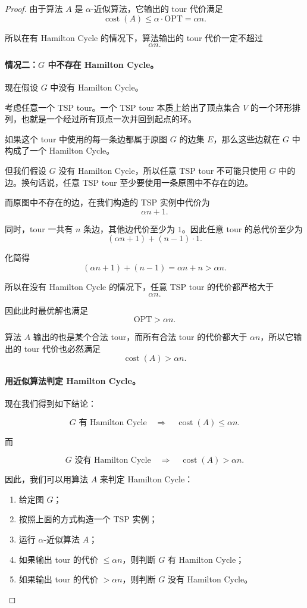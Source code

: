 \documentclass[UTF8,openany,12pt]{ctexbook}
\theoremstyle{remark}
\newcommand{\OPT}{\mathrm{OPT}}
\begin{document}
\begin{proof}
由于算法 $A$ 是 $\alpha$-近似算法，它输出的 tour 代价满足
\[
\operatorname{cost}(A) \le \alpha \cdot \OPT = \alpha n.
\]

所以在有 Hamilton Cycle 的情况下，算法输出的 tour 代价一定不超过
\[
\alpha n.
\]

\paragraph{情况二：$G$ 中不存在 Hamilton Cycle。}

现在假设 $G$ 中没有 Hamilton Cycle。

考虑任意一个 TSP tour。一个 TSP tour 本质上给出了顶点集合 $V$ 的一个环形排列，也就是一个经过所有顶点一次并回到起点的环。

如果这个 tour 中使用的每一条边都属于原图 $G$ 的边集 $E$，那么这些边就在 $G$ 中构成了一个 Hamilton Cycle。

但我们假设 $G$ 没有 Hamilton Cycle，所以任意 TSP tour 不可能只使用 $G$ 中的边。换句话说，任意 TSP tour 至少要使用一条原图中不存在的边。

而原图中不存在的边，在我们构造的 TSP 实例中代价为
\[
\alpha n + 1.
\]

同时，tour 一共有 $n$ 条边，其他边代价至少为 $1$。因此任意 tour 的总代价至少为
\[
(\alpha n + 1) + (n-1)\cdot 1.
\]

化简得
\[
(\alpha n + 1) + (n-1)
= \alpha n + n
> \alpha n.
\]

所以在没有 Hamilton Cycle 的情况下，任意 TSP tour 的代价都严格大于
\[
\alpha n.
\]

因此此时最优解也满足
\[
\OPT > \alpha n.
\]

算法 $A$ 输出的也是某个合法 tour，而所有合法 tour 的代价都大于 $\alpha n$，所以它输出的 tour 代价也必然满足
\[
\operatorname{cost}(A) > \alpha n.
\]

\paragraph{用近似算法判定 Hamilton Cycle。}

现在我们得到如下结论：

\[
G \text{ 有 Hamilton Cycle}
\quad \Longrightarrow \quad
\operatorname{cost}(A) \le \alpha n.
\]

而

\[
G \text{ 没有 Hamilton Cycle}
\quad \Longrightarrow \quad
\operatorname{cost}(A) > \alpha n.
\]

因此，我们可以用算法 $A$ 来判定 Hamilton Cycle：

\begin{enumerate}
    \item 给定图 $G$；
    \item 按照上面的方式构造一个 TSP 实例；
    \item 运行 $\alpha$-近似算法 $A$；
    \item 如果输出 tour 的代价 $\le \alpha n$，则判断 $G$ 有 Hamilton Cycle；
    \item 如果输出 tour 的代价 $> \alpha n$，则判断 $G$ 没有 Hamilton Cycle。
\end{enumerate}


\end{proof}
\end{document}
